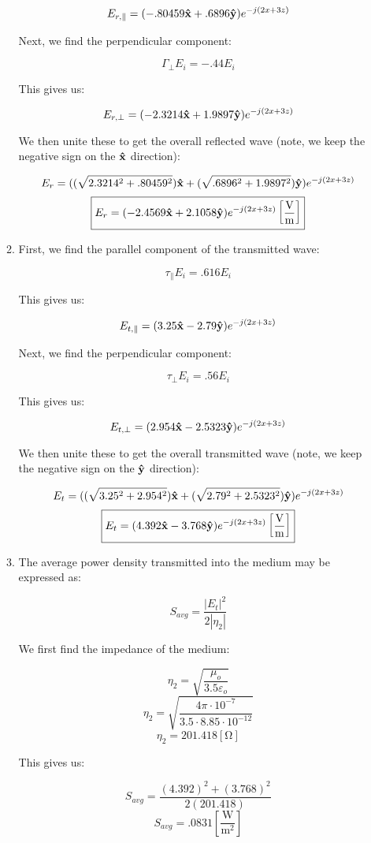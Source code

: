 \begin{enumerate}
\begin{enumerate}
        $$E_{r,\parallel}=(-.80459\bold{\hat{x}}+.6896\bold{\hat{y}})e^{-j(2x+3z)}$$

        Next, we find the perpendicular component:

        $$\Gamma_{\perp}E_i=-.44E_i$$

        This gives us:

        $$E_{r,\perp}=(-2.3214\bold{\hat{x}}+1.9897\bold{\hat{y}})e^{-j(2x+3z)}$$

        We then unite these to get the overall reflected wave (note, we keep the negative sign on the $\bold{\hat{x}}$ direction):

        $$E_r=((\sqrt{2.3214^2+.80459^2})\bold{\hat{x}}+(\sqrt{.6896^2+1.9897^2})\bold{\hat{y}})e^{-j(2x+3z)}$$
        $$\boxed{E_r=(-2.4569\bold{\hat{x}}+2.1058\bold{\hat{y}})e^{-j(2x+3z)}\left[ \frac{\si{\volt}}{\si{\meter}} \right]}$$

      \item 

        First, we find the parallel component of the transmitted wave:

        $$\tau_{\parallel}E_i=.616E_i$$

        This gives us:

        $$E_{t,\parallel}=(3.25\bold{\hat{x}}-2.79\bold{\hat{y}})e^{-j(2x+3z)}$$

        Next, we find the perpendicular component:

        $$\tau_{\perp}E_i=.56E_i$$

        This gives us:

        $$E_{t,\perp}=(2.954\bold{\hat{x}}-2.5323\bold{\hat{y}})e^{-j(2x+3z)}$$

        We then unite these to get the overall transmitted wave (note, we keep the negative sign on the $\bold{\hat{y}}$ direction):

        $$E_t=((\sqrt{3.25^2+2.954^2})\bold{\hat{x}}+(\sqrt{2.79^2+2.5323^2})\bold{\hat{y}})e^{-j(2x+3z)}$$
        $$\boxed{E_t=(4.392\bold{\hat{x}}-3.768\bold{\hat{y}})e^{-j(2x+3z)}\left[ \frac{\si{\volt}}{\si{\meter}} \right]}$$

      \item 

        The average power density transmitted into the medium may be expressed as:

        $$S_{avg}=\frac{|E_t|^2}{2|\eta_2|}$$

        We first find the impedance of the medium:

        $$\eta_2=\sqrt{\frac{\mu_o}{3.5\varepsilon_o}}$$
        $$\eta_2=\sqrt{\frac{4\pi\cdot10^{-7}}{3.5\cdot8.85\cdot10^{-12}}}$$
        $$\eta_2=201.418[\si{\ohm}]$$

        This gives us:

        $$S_{avg}=\frac{(4.392)^2+(3.768)^2}{2(201.418)}$$
        $$\boxed{S_{avg}=.0831\left[ \frac{\si{\watt}}{\si{\meter\squared}} \right]}$$

    \end{enumerate}

\end{enumerate}



